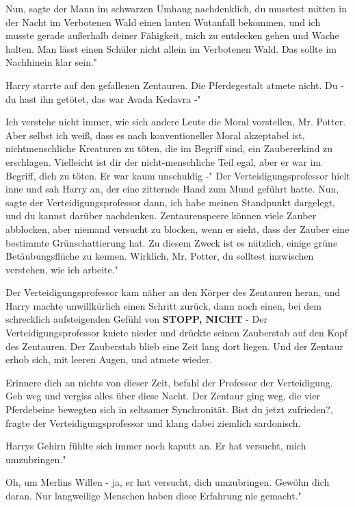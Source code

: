 \glqq{}Nun\grqq{}, sagte der Mann im schwarzen Umhang nachdenklich, \glqq{}du
musstest mitten in der Nacht im Verbotenen Wald einen lauten Wutanfall bekommen,
und ich musste gerade außerhalb deiner Fähigkeit, mich zu entdecken gehen und
Wache halten. Man lässt einen Schüler nicht allein im Verbotenen Wald. Das
sollte im Nachhinein klar sein."

Harry starrte auf den gefallenen Zentauren. Die Pferdegestalt atmete nicht.
\glqq{}Du - du hast ihn getötet, das war Avada Kedavra -"

\glqq{}Ich verstehe nicht immer, wie sich andere Leute die Moral vorstellen, Mr.
Potter. Aber selbst ich weiß, dass es nach konventioneller Moral akzeptabel ist,
nichtmenschliche Kreaturen zu töten, die im Begriff sind, ein Zaubererkind zu
erschlagen. Vielleicht ist dir der nicht-menschliche Teil egal, aber er war im
Begriff, dich zu töten. Er war kaum unschuldig -" Der Verteidigungsprofessor
hielt inne und sah Harry an, der eine zitternde Hand zum Mund geführt hatte.
\glqq{}Nun\grqq{}, sagte der Verteidigungsprofessor dann, \glqq{}ich habe meinen
Standpunkt dargelegt, und du kannst darüber nachdenken. Zentaurenspeere können
viele Zauber abblocken, aber niemand versucht zu blocken, wenn er sieht, dass
der Zauber eine bestimmte Grünschattierung hat. Zu diesem Zweck ist es nützlich,
einige grüne Betäubungsflüche zu kennen. Wirklich, Mr. Potter, du solltest
inzwischen verstehen, wie ich arbeite."

Der Verteidigungsprofessor kam näher an den Körper des Zentauren heran, und
Harry machte unwillkürlich einen Schritt zurück, dann noch einen, bei dem
schrecklich aufsteigenden Gefühl von \textbf{STOPP, NICHT} - Der
Verteidigungsprofessor kniete nieder und drückte seinen Zauberstab auf den Kopf
des Zentauren. Der Zauberstab blieb eine Zeit lang dort liegen. Und der Zentaur
erhob sich, mit leeren Augen, und atmete wieder.

\glqq{}Erinnere dich an nichts von dieser Zeit\grqq{}, befahl der Professor der
Verteidigung. \glqq{}Geh weg und vergiss alles über diese Nacht.\grqq{} Der
Zentaur ging weg, die vier Pferdebeine bewegten sich in seltsamer Synchronität.
\glqq{}Bist du jetzt zufrieden?\grqq{}, fragte der Verteidigungsprofessor und
klang dabei ziemlich sardonisch.

Harrys Gehirn fühlte sich immer noch kaputt an. \glqq{}Er hat versucht, mich
umzubringen."

\glqq{}Oh, um Merlins Willen - ja, er hat versucht, dich umzubringen. Gewöhn dich
daran. Nur langweilige Menschen haben diese Erfahrung nie gemacht."

